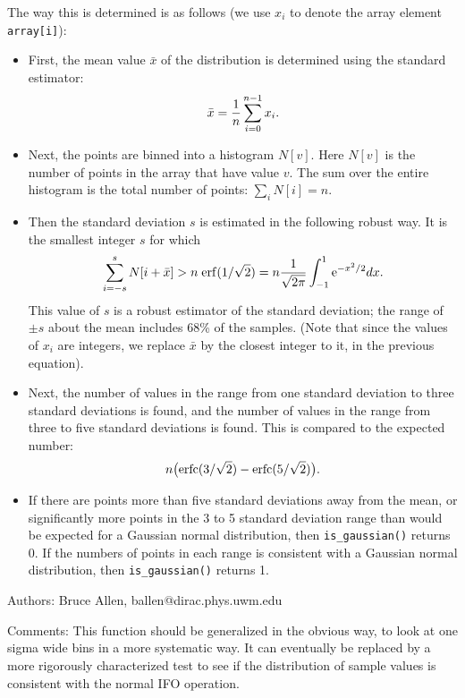 The way this is determined is as follows (we use $x_i$ to denote the
array element {\tt array[i]}):
\begin{itemize}
\item
First, the mean value $\bar x$ of the distribution is determined using the
standard estimator:
\begin{equation}
        \bar x = {1 \over n} \sum_{i=0}^{n-1} x_i.
\end{equation}
\item
Next, the points are binned into a histogram $N[v]$.  Here $N[v]$ is
the number of points in the array that have value $v$.  The sum over
the entire histogram is the total number of points: $\sum_i N[i] = n$.
\item
Then the standard deviation $s$ is estimated in the following robust
way.  It is the smallest integer $s$ for which 
\begin{equation}
        \sum_{i=-s}^{s} N[i+\bar x] > n \; {\rm erf}(1/\sqrt{2}) = 
n {1 \over \sqrt{2 \pi}} \int_{-1}^{1} {\rm e}^{-x^2/2} dx.
\end{equation}
This value of $s$ is a robust estimator of the standard deviation; the
range of $\pm s$ about the mean includes 68\% of the samples.  (Note
that since the values of $x_i$ are integers, we replace $\bar x$ by the
closest integer to it, in the previous equation).
\item 
Next, the number of values in the range from one standard deviation
to three standard deviations is found, and the number of values
in the range from three to five standard deviations is found.
This is compared to the expected
number:
\begin{equation}
          n \bigl( {\rm erfc}(3/\sqrt{2})-{\rm erfc}(5/\sqrt{2}) \bigr) .
\end{equation}
\item
If there are points more than five standard deviations away from
the mean, or significantly more points in the 3 to 5 standard deviation
range than would be expected for a Gaussian normal distribution, then
{\tt is\_gaussian()} returns 0.  If the numbers of points
in each range is consistent with a Gaussian normal distribution,
then {\tt is\_gaussian()} returns 1.
\end{itemize}
\begin{description}
\item{Authors:}
Bruce Allen, ballen@dirac.phys.uwm.edu
\item{Comments:}
This function should be generalized in the obvious way, to look at one
sigma wide bins in a more systematic way.  It can eventually be
replaced by a more rigorously characterized test to see if the
distribution of sample values is consistent with the normal IFO
operation.
\end{description}
\clearpage

